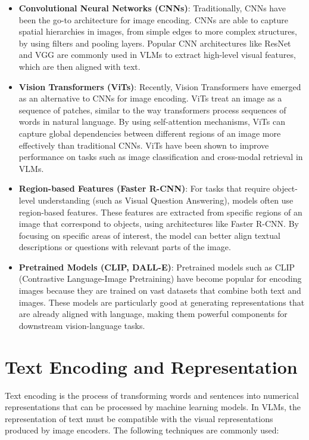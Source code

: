 \begin{itemize}
    \item \textbf{Convolutional Neural Networks (CNNs)}: Traditionally, CNNs have been the go-to architecture for image encoding. CNNs are able to capture spatial hierarchies in images, from simple edges to more complex structures, by using filters and pooling layers. Popular CNN architectures like ResNet and VGG are commonly used in VLMs to extract high-level visual features, which are then aligned with text.
    \item \textbf{Vision Transformers (ViTs)}: Recently, Vision Transformers have emerged as an alternative to CNNs for image encoding. ViTs treat an image as a sequence of patches, similar to the way transformers process sequences of words in natural language. By using self-attention mechanisms, ViTs can capture global dependencies between different regions of an image more effectively than traditional CNNs. ViTs have been shown to improve performance on tasks such as image classification and cross-modal retrieval in VLMs.
    \item \textbf{Region-based Features (Faster R-CNN)}: For tasks that require object-level understanding (such as Visual Question Answering), models often use region-based features. These features are extracted from specific regions of an image that correspond to objects, using architectures like Faster R-CNN. By focusing on specific areas of interest, the model can better align textual descriptions or questions with relevant parts of the image.
    \item \textbf{Pretrained Models (CLIP, DALL-E)}: Pretrained models such as CLIP (Contrastive Language-Image Pretraining) have become popular for encoding images because they are trained on vast datasets that combine both text and images. These models are particularly good at generating representations that are already aligned with language, making them powerful components for downstream vision-language tasks.
\end{itemize}

\section{Text Encoding and Representation}

Text encoding is the process of transforming words and sentences into numerical representations that can be processed by machine learning models. In VLMs, the representation of text must be compatible with the visual representations produced by image encoders. The following techniques are commonly used:

